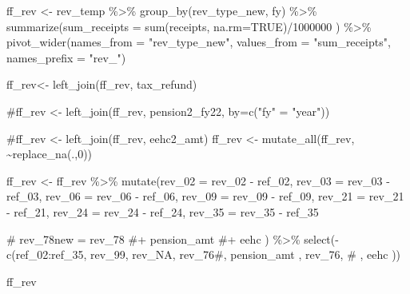 \documentclass[
  letterpaper,
  DIV=11,
  numbers=noendperiod]{scrreport}
\newenvironment{Shaded}{\begin{snugshade}}{\end{snugshade}}
\newcommand{\AttributeTok}[1]{\textcolor[rgb]{0.40,0.45,0.13}{#1}}
\newcommand{\CommentTok}[1]{\textcolor[rgb]{0.37,0.37,0.37}{#1}}
\newcommand{\ConstantTok}[1]{\textcolor[rgb]{0.56,0.35,0.01}{#1}}
\newcommand{\DecValTok}[1]{\textcolor[rgb]{0.68,0.00,0.00}{#1}}
\newcommand{\FunctionTok}[1]{\textcolor[rgb]{0.28,0.35,0.67}{#1}}
\newcommand{\NormalTok}[1]{\textcolor[rgb]{0.00,0.23,0.31}{#1}}
\newcommand{\OtherTok}[1]{\textcolor[rgb]{0.00,0.23,0.31}{#1}}
\newcommand{\SpecialCharTok}[1]{\textcolor[rgb]{0.37,0.37,0.37}{#1}}
\newcommand{\StringTok}[1]{\textcolor[rgb]{0.13,0.47,0.30}{#1}}
\begin{document}
\begin{Shaded}
\begin{Highlighting}[]
\NormalTok{ff\_rev }\OtherTok{\textless{}{-}}\NormalTok{ rev\_temp }\SpecialCharTok{\%\textgreater{}\%} 
  \FunctionTok{group\_by}\NormalTok{(rev\_type\_new, fy) }\SpecialCharTok{\%\textgreater{}\%} 
  \FunctionTok{summarize}\NormalTok{(}\AttributeTok{sum\_receipts =} \FunctionTok{sum}\NormalTok{(receipts, }\AttributeTok{na.rm=}\ConstantTok{TRUE}\NormalTok{)}\SpecialCharTok{/}\DecValTok{1000000}\NormalTok{ ) }\SpecialCharTok{\%\textgreater{}\%}
  \FunctionTok{pivot\_wider}\NormalTok{(}\AttributeTok{names\_from =} \StringTok{"rev\_type\_new"}\NormalTok{, }\AttributeTok{values\_from =} \StringTok{"sum\_receipts"}\NormalTok{, }\AttributeTok{names\_prefix =} \StringTok{"rev\_"}\NormalTok{)}

\NormalTok{ff\_rev}\OtherTok{\textless{}{-}} \FunctionTok{left\_join}\NormalTok{(ff\_rev, tax\_refund)}

\CommentTok{\#ff\_rev \textless{}{-} left\_join(ff\_rev, pension2\_fy22, by=c("fy" = "year"))}

\CommentTok{\#ff\_rev \textless{}{-} left\_join(ff\_rev, eehc2\_amt) }
\NormalTok{ff\_rev }\OtherTok{\textless{}{-}} \FunctionTok{mutate\_all}\NormalTok{(ff\_rev, }\SpecialCharTok{\textasciitilde{}}\FunctionTok{replace\_na}\NormalTok{(.,}\DecValTok{0}\NormalTok{))}


\NormalTok{ff\_rev }\OtherTok{\textless{}{-}}\NormalTok{ ff\_rev }\SpecialCharTok{\%\textgreater{}\%}
  \FunctionTok{mutate}\NormalTok{(}\AttributeTok{rev\_02 =}\NormalTok{ rev\_02 }\SpecialCharTok{{-}}\NormalTok{ ref\_02,}
         \AttributeTok{rev\_03 =}\NormalTok{ rev\_03 }\SpecialCharTok{{-}}\NormalTok{ ref\_03,}
         \AttributeTok{rev\_06 =}\NormalTok{ rev\_06 }\SpecialCharTok{{-}}\NormalTok{ ref\_06,}
         \AttributeTok{rev\_09 =}\NormalTok{ rev\_09 }\SpecialCharTok{{-}}\NormalTok{ ref\_09,}
         \AttributeTok{rev\_21 =}\NormalTok{ rev\_21 }\SpecialCharTok{{-}}\NormalTok{ ref\_21,}
         \AttributeTok{rev\_24 =}\NormalTok{ rev\_24 }\SpecialCharTok{{-}}\NormalTok{ ref\_24,}
         \AttributeTok{rev\_35 =}\NormalTok{ rev\_35 }\SpecialCharTok{{-}}\NormalTok{ ref\_35}

      \CommentTok{\#   rev\_78new = rev\_78 \#+ pension\_amt \#+ eehc}
\NormalTok{         ) }\SpecialCharTok{\%\textgreater{}\%} 
  \FunctionTok{select}\NormalTok{(}\SpecialCharTok{{-}}\FunctionTok{c}\NormalTok{(ref\_02}\SpecialCharTok{:}\NormalTok{ref\_35, rev\_99, rev\_NA, rev\_76}\CommentTok{\#, pension\_amt , rev\_76,}
          \CommentTok{\#  , eehc}
\NormalTok{            ))}

\NormalTok{ff\_rev}
\end{Highlighting}
\end{Shaded}
\end{document}

